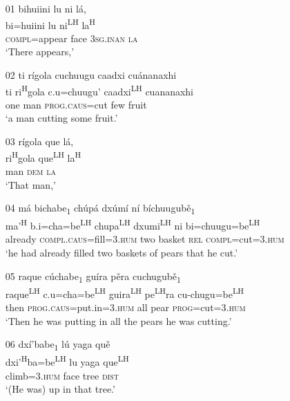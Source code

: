\ea 
\begin{itemize}
\item[01]
\glll bihuiini lu ni l\'{a}, \\
bi=huiini lu ni\textsuperscript{LH} la\textsuperscript{H} \\
\textsc{compl}=appear face \textsc{3sg.inan} \textsc{la} \\
\glt `There appears,'


\item[02]
\glll ti r\'{i}gola cuchuugu caadxi cu\'{a}nanaxhi \\
ti ri\textsuperscript{H}gola c.u=chuugu' caadxi\textsuperscript{LH} cuananaxhi \\
one man \textsc{prog}.\textsc{caus}=cut few fruit \\
\glt `a man cutting some fruit.'


\item[03]
\glll r\'{i}gola que l\'{a},  \\
ri\textsuperscript{H}gola que\textsuperscript{LH} la\textsuperscript{H} \\
man \textsc{dem} \textsc{la} \\
\glt `That man,'


\item[04]
\glll m\'{a} bichabe\textsubscript{1} ch\'{u}p\'{a} dx\'{u}m\'{i} n\'{i} b\'{i}chuugub\v{e}\textsubscript{1} \\
ma'\textsuperscript{H} b.i=cha=be\textsuperscript{LH}  chupa\textsuperscript{LH} dxumi\textsuperscript{LH} ni bi=chuugu=be\textsuperscript{LH}  \\
already \textsc{compl}.\textsc{caus}=fill=\textsc{3.hum} two basket \textsc{rel} \textsc{compl}=cut=\textsc{3.hum} \\
\glt `he had already filled two baskets of pears that he cut.'


\item[05]
\glll raque c\'{u}chabe\textsubscript{1} gu\'{i}ra p\v{e}ra cuchugub\v{e}\textsubscript{1} \\
raque\textsuperscript{LH} c.u=cha=be\textsuperscript{LH}  guira\textsuperscript{LH} pe\textsuperscript{LH}ra cu-chugu=be\textsuperscript{LH}  \\
then \textsc{prog}.\textsc{caus}=put.in=\textsc{3.hum} all pear \textsc{prog}=cut=\textsc{3.hum} \\
\glt `Then he was putting in all the pears he was cutting.'


\item[06]
\glll dx\'{i}'babe\textsubscript{1} l\'{u} yaga qu\v{e} \\
dxi'\textsuperscript{H}ba=be\textsuperscript{LH}  lu yaga que\textsuperscript{LH} \\
climb=\textsc{3.hum} face tree \textsc{dist} \\
\glt `(He was) up in that tree.'



\end{itemize}
